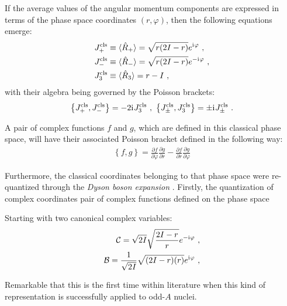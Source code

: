 If the average values of the angular momentum components are expressed in terms of the phase space coordinates $(r,\varphi)$, then the following equations emerge:
\begin{align}
    J_+^\text{cls}&\equiv\langle\hat{R}_+\rangle=\sqrt{r(2I-r)}e^{\iu\varphi}\ ,\nonumber \\
    J_-^\text{cls}&\equiv\langle\hat{R}_-\rangle=\sqrt{r(2I-r)}e^{-\iu\varphi}\ ,\nonumber \\
    J_3^\text{cls}&\equiv\langle\hat{R}_3\rangle=r-I\ ,
    \label{classical-am-components-boson}
\end{align} 
with their algebra being governed by the Poisson brackets:
\begin{align}
    \left\{J_+^\text{cls},J_-^\text{cls}\right\}=-2\iu J_3^\text{cls}\ ,\ \left\{J_\pm^\text{cls},J_3^\text{cls}\right\}=\pm\iu J_{\pm}^\text{cls}\ .
\end{align} 

A pair of complex functions $f$ and $g$, which are defined in this classical phase space, will have their associated Poisson bracket defined in the following way:
\begin{align}
    \left\{f,g\right\}=\frac{\partial f}{\partial \varphi}\frac{\partial g}{\partial r} - \frac{\partial f}{\partial r}\frac{\partial g}{\partial \varphi}
\end{align} 

Furthermore, the classical coordinates belonging to that phase space were re-quantized through the \emph{Dyson boson expansion} \cite{dyson1956general}. Firstly, the quantization of complex coordinates  pair of complex functions defined on the phase space  

Starting with two canonical complex variables:
\begin{align}
    \mathcal{C}=\sqrt{2I}\sqrt{\frac{2I-r}{r}}e^{-\iu\varphi}\ ,\nonumber\\
    \mathcal{B}=\frac{1}{\sqrt{2I}}\sqrt{(2I-r)(r)}e^{\iu\varphi}\ ,
\end{align}


Remarkable that this is the first time within literature when this kind of representation is successfully applied to odd-$A$ nuclei.